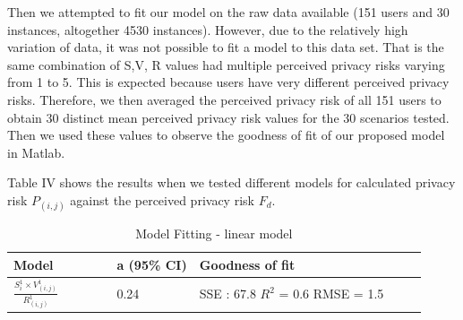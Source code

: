 \documentclass[conference]{IEEEtran}
\begin{document}
Then we attempted to fit our model on the raw data available (151 users and 30 instances, altogether 4530 instances). However, due to the relatively high variation of data, it was not possible to fit a model to this data set. That is the same combination of S,V, R values had multiple perceived privacy risks varying from 1 to 5. This is expected because users have very different perceived privacy risks. Therefore, we then averaged the perceived privacy risk of all 151 users to obtain 30 distinct mean perceived privacy risk values for the 30 scenarios tested. Then we used these values to observe the goodness of fit of our proposed model in Matlab. 

Table IV shows the results when we tested different models for calculated privacy risk $P_{(i,j)}$ against the perceived privacy risk $F_d$. 

\begin{center}
\begin{table}[htbp]
\caption{Model Fitting - linear model}
\begin{center}
\begin{adjustbox}{width=0.5\textwidth} 
\begin{tabular}{|p{0.25\linewidth}|p{0.2\linewidth}|p{0.55\linewidth}|} 
\hline
Model & a (95\% CI) & Goodness of fit\\
\hline
$\frac{S_{i}^1 \times V_{(i,j)}^1}{R_{(i,j)}^1}$  & 0.24 & SSE : 67.8  $R^2$ = 0.6 RMSE = 1.5 \\
\hline
\end{tabular}
\end{adjustbox}
\end{center}
\end{table}
\end{center} 
\end{document}

